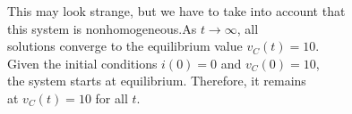 \documentclass[preview]{standalone}
\begin{document}
\begin{center}
\raggedright
                        This may look strange, but we have to take into account that \\ 
                        this system is nonhomogeneous.As $t \rightarrow \infty$, all \\
                        solutions converge to the equilibrium value $v_C(t) = 10$.  \\
                        Given  the initial conditions $i(0) = 0$ and $v_C(0) = 10$, \\
                        the system starts at equilibrium. Therefore, it remains \\
                        at $v_C(t) = 10$ for all $t$.
\end{center}
\end{document}
